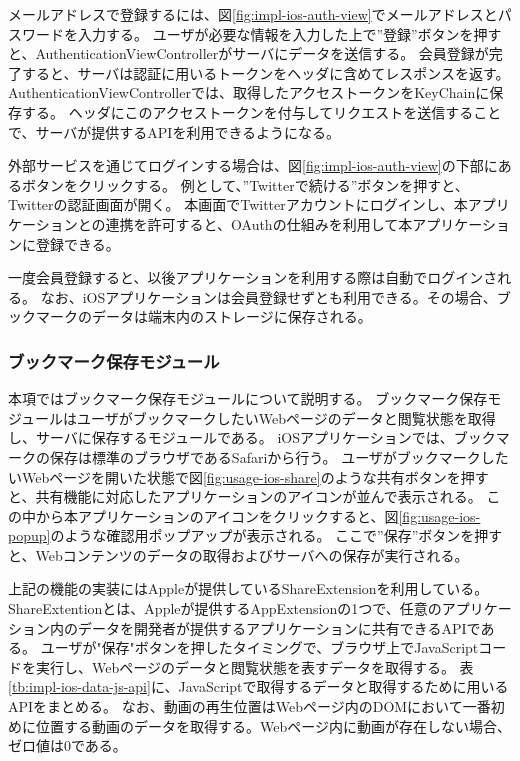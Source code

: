 メールアドレスで登録するには、図\ref{fig:impl-ios-auth-view}でメールアドレスとパスワードを入力する。
ユーザが必要な情報を入力した上で”登録”ボタンを押すと、AuthenticationViewControllerがサーバにデータを送信する。
会員登録が完了すると、サーバは認証に用いるトークンをヘッダに含めてレスポンスを返す。
AuthenticationViewControllerでは、取得したアクセストークンをKeyChain\cite{}に保存する。
ヘッダにこのアクセストークンを付与してリクエストを送信することで、サーバが提供するAPIを利用できるようになる。

外部サービスを通じてログインする場合は、図\ref{fig:impl-ios-auth-view}の下部にあるボタンをクリックする。
例として、”Twitterで続ける”ボタンを押すと、Twitter\cite{}の認証画面が開く。
本画面でTwitterアカウントにログインし、本アプリケーションとの連携を許可すると、OAuthの仕組みを利用して本アプリケーションに登録できる。

一度会員登録すると、以後アプリケーションを利用する際は自動でログインされる。
なお、iOSアプリケーションは会員登録せずとも利用できる。その場合、ブックマークのデータは端末内のストレージに保存される。

\subsubsection{ブックマーク保存モジュール}
本項ではブックマーク保存モジュールについて説明する。
ブックマーク保存モジュールはユーザがブックマークしたいWebページのデータと閲覧状態を取得し、サーバに保存するモジュールである。
iOSアプリケーションでは、ブックマークの保存は標準のブラウザであるSafariから行う。
ユーザがブックマークしたいWebページを開いた状態で図\ref{fig:usage-ios-share}のような共有ボタンを押すと、共有機能に対応したアプリケーションのアイコンが並んで表示される。
この中から本アプリケーションのアイコンをクリックすると、図\ref{fig:usage-ios-popup}のような確認用ポップアップが表示される。
ここで”保存”ボタンを押すと、Webコンテンツのデータの取得およびサーバへの保存が実行される。

上記の機能の実装にはAppleが提供しているShareExtension\cite{}を利用している。
ShareExtentionとは、Appleが提供するAppExtension\cite{app-extension}の1つで、任意のアプリケーション内のデータを開発者が提供するアプリケーションに共有できるAPIである。
ユーザが"保存"ボタンを押したタイミングで、ブラウザ上でJavaScriptコードを実行し、Webページのデータと閲覧状態を表すデータを取得する。
表\ref{tb:impl-ios-data-js-api}に、JavaScriptで取得するデータと取得するために用いるAPIをまとめる。
なお、動画の再生位置はWebページ内のDOMにおいて一番初めに位置する動画のデータを取得する。Webページ内に動画が存在しない場合、ゼロ値は0である。

